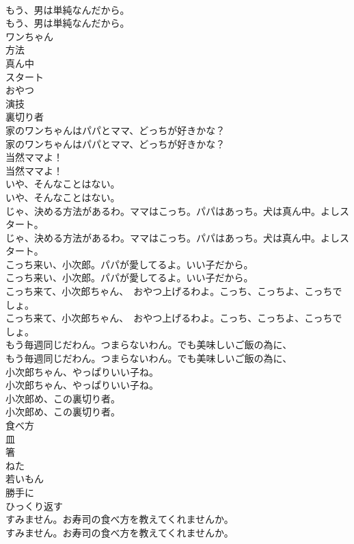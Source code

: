 \documentclass[8pt]{extreport}
\begin{document}
\begin{CJK}{UTF8}{min}
\\	もう、男は単純なんだから。	
\\	もう、男は単純なんだから。 
\\	ワンちゃん
\\	方法
\\	真ん中
\\	スタート
\\	おやつ
\\	演技
\\	裏切り者
\\	家のワンちゃんはパパとママ、どっちが好きかな？	
\\	家のワンちゃんはパパとママ、どっちが好きかな？ 
\\	当然ママよ！	
\\	当然ママよ！ 
\\	いや、そんなことはない。	
\\	いや、そんなことはない。 
\\	じゃ、決める方法があるわ。ママはこっち。パパはあっち。犬は真ん中。よしスタート。	
\\	じゃ、決める方法があるわ。ママはこっち。パパはあっち。犬は真ん中。よしスタート。 
\\	こっち来い、小次郎。パパが愛してるよ。いい子だから。	
\\	こっち来い、小次郎。パパが愛してるよ。いい子だから。 
\\	こっち来て、小次郎ちゃん、　おやつ上げるわよ。こっち、こっちよ、こっちでしょ。	
\\	こっち来て、小次郎ちゃん、　おやつ上げるわよ。こっち、こっちよ、こっちでしょ。 
\\	もう毎週同じだわん。つまらないわん。でも美味しいご飯の為に、	
\\	もう毎週同じだわん。つまらないわん。でも美味しいご飯の為に、 
\\	小次郎ちゃん、やっぱりいい子ね。	
\\	小次郎ちゃん、やっぱりいい子ね。 
\\	小次郎め、この裏切り者。	
\\	小次郎め、この裏切り者。 
\\	食べ方
\\	皿
\\	箸
\\	ねた
\\	若いもん
\\	勝手に
\\	ひっくり返す
\\	すみません。お寿司の食べ方を教えてくれませんか。	
\\	すみません。お寿司の食べ方を教えてくれませんか。 

\end{CJK}
\end{document}
